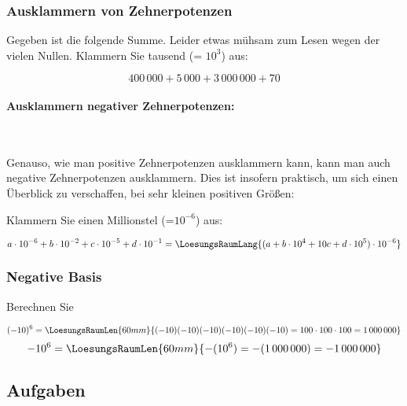 \subsubsection{Ausklammern von Zehnerpotenzen}
Gegeben ist die folgende Summe. Leider etwas mühsam zum Lesen wegen der vielen Nullen. Klammern Sie tausend (= $10^3$) aus:

$$400\,000 + 5\,000 + 3\,000\,000 + 70$$


\paragraph{Ausklammern negativer Zehnerpotenzen:}
\,

\vspace{1mm}

Genauso, wie man positive Zehnerpotenzen ausklammern kann, kann man auch negative Zehnerpotenzen ausklammern. Dies ist insofern praktisch, um sich einen Überblick zu verschaffen, bei sehr kleinen positiven Größen:

Klammern Sie einen Millionstel (=$10^{-6}$) aus:


$$a\cdot{}10^{-6} + b\cdot{}10^{-2} + c\cdot{}10^{-5} +
d\cdot{}10^{-1} = \LoesungsRaumLang{(a + b\cdot{}10^4 + 10c + d\cdot{}10^{5}) \cdot{} 10^{-6}}$$

\subsubsection{Negative Basis}

Berechnen Sie

$$(-10)^6 = \LoesungsRaumLen{60mm}{ (-10)(-10)(-10)(-10)(-10)(-10) = 100 \cdot{} 100 \cdot{} 100 = 1\,000\,000 }$$
$$-10^6   = \LoesungsRaumLen{60mm}{ -(10^6) = - (1\,000\,000) = -1\,000\,000 }$$

\subsection*{Aufgaben}





\newpage
